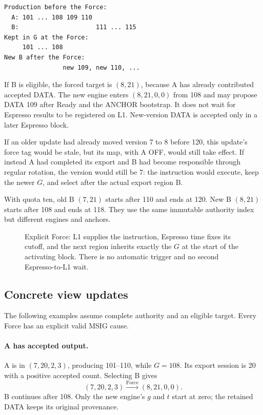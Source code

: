 \documentclass[11pt,a4paper]{article}
\begin{document}
\begin{center}\small
\begin{verbatim}
Production before the Force:
  A: 101 ... 108 109 110
  B:                     111 ... 115
Kept in G at the Force:
     101 ... 108
New B after the Force:
                new 109, new 110, ...
\end{verbatim}
\end{center}

If B is eligible, the forced target is $(8,21)$, because A has already
contributed accepted DATA. The new engine enters $(8,21,0,0)$ from 108 and
may propose DATA 109 after Ready and the ANCHOR bootstrap. It does not
wait for Espresso results to be registered on L1. New-version DATA is
accepted only in a later Espresso block.

If an older update had already moved version 7 to 8 before 120, this
update's force tag would be stale, but its map, with A OFF, would still
take effect. If instead A had completed its export and B had become
responsible through regular rotation, the version would still be 7: the
instruction would execute, keep the newer $G$, and select after the
actual export region B.

With quota ten, old B $(7,21)$ starts after 110 and ends at 120. New B
$(8,21)$ starts after 108 and ends at 118. They use the same immutable
authority index but different engines and anchors.

\begin{figure}[p]\centering

\caption{Explicit Force: L1 supplies the instruction, Espresso time fixes
its cutoff, and the next region inherits exactly the $G$ at the start of
the activating block. There is no automatic trigger and no second
Espresso-to-L1 wait.}
\label{fig:forced-cross-region}
\end{figure}
\FloatBarrier

\subsection{Concrete view updates}
\label{sec:force-view-examples}
The following examples assume complete authority and an eligible target.
Every Force has an explicit valid MSIG cause.

\paragraph{A has accepted output.}
A is in $(7,20,2,3)$, producing 101--110, while $G=108$. Its export
session is 20 with a positive accepted count. Selecting B gives
\[
 (7,20,2,3)\xrightarrow{\mathrm{Force}}(8,21,0,0).
\]
B continues after 108. Only the new engine's $g$ and $t$ start at zero;
the retained DATA keeps its original provenance.
\end{document}
